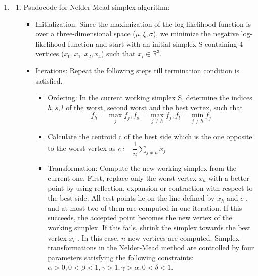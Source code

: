 \documentclass[12pt]{article}
\begin{document}
\begin{enumerate}[label=(\alph*)]
\item
\begin{enumerate}[label=(\roman*)]
\item Psudocode for Nelder-Mead simplex algorithm:
\begin{itemize}
\item Initialization: Since the maximization of the log-likelihood function is over a three-dimensional space ($\mu, \xi, \sigma$), we minimize the negative log-likelihood function and start with an initial simplex S containing 4 vertices ($x_0, x_1, x_2, x_4$) such that $x_i \in \mathbb{R}^3$.
\item Iterations: Repeat the following steps till termination condition is satisfied.
\begin{itemize}
\item Ordering: In the current working simplex S, determine the indices $h,s,l$ of the worst, second worst and the best vertex, such that
\[f_h=\max_{j}f_j, f_s=\max_{j\neq h}f_j, f_l=\min_{j\neq h}f_j\]
\item Calculate the centroid c of the best side which is the one opposite to the worst vertex as $c:=\dfrac{1}{n}\sum_{j\neq h}x_j$
\item Transformation: Compute the new working simplex from the current one. First, replace only the worst vertex $x_h$ with a better point by using reflection, expansion or contraction with respect to the best side. All test points lie on the line defined by $x_h$ and $c$ , and at most two of them are computed in one iteration. If this succeeds, the accepted point becomes the new vertex of the working simplex. If this fails, shrink the simplex towards the best vertex $x_l$ . In this case, $n$ new vertices are computed. Simplex transformations in the Nelder-Mead method are controlled by four parameters satisfying the following constraints: $\alpha>0,0<\beta<1,\gamma>1,\gamma>\alpha,0<\delta<1$.


\end{itemize}
\end{itemize}
\end{enumerate}
\end{enumerate}
\end{document}

